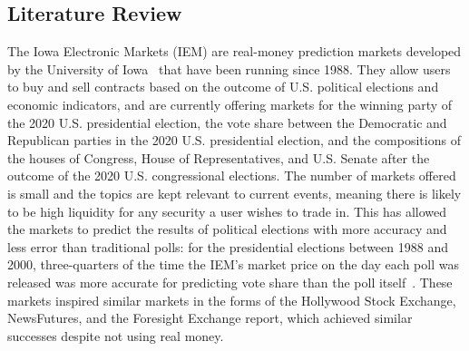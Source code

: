 \subsection{Literature Review}


The Iowa Electronic Markets (IEM) are real-money prediction markets developed
by the University of Iowa~\cite{IEM} that have been running since 1988. They
allow users to buy and sell contracts based on the outcome of U.S. political
elections and economic indicators, and are currently offering markets for the
winning party of the 2020 U.S. presidential election, the vote share between
the Democratic and Republican parties in the 2020 U.S. presidential election,
and the compositions of the houses of Congress, House of Representatives, and
U.S. Senate after the outcome of the 2020 U.S. congressional elections. The
number of markets offered is small and the topics are kept relevant to current
events, meaning there is likely to be high liquidity for any security a user
wishes to trade in. This has allowed the markets to predict the results of
political elections with more accuracy and less error than traditional polls:
for the presidential elections between 1988 and 2000, three-quarters of the
time the IEM's market price on the day each poll was released was more accurate
for predicting vote share than the poll itself~\cite[pg.~19]{WisdomOfCrowds}.
These markets inspired similar markets in the forms of the Hollywood Stock
Exchange, NewsFutures, and the Foresight Exchange report, which achieved
similar successes despite not using real money. 


